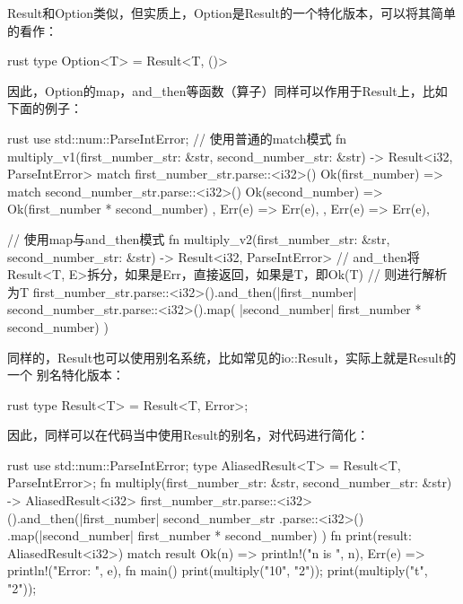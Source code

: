 Result和Option类似，但实质上，Option是Result的一个特化版本，可以将其简单的看作：
\begin{code-block}{rust}
type Option<T> = Result<T, ()>
\end{code-block}

因此，Option的map，and\_then等函数（算子）同样可以作用于Result上，比如下面的例子：
\begin{code-block}{rust}
use std::num::ParseIntError;
// 使用普通的match模式
fn multiply_v1(first_number_str: &str, second_number_str: &str) -> Result<i32, ParseIntError> {
    match first_number_str.parse::<i32>() {
        Ok(first_number)  => {
            match second_number_str.parse::<i32>() {
                Ok(second_number)  => {
                    Ok(first_number * second_number)
                },
                Err(e) => Err(e),
            }
        },
        Err(e) => Err(e),
    }
}

// 使用map与and_then模式
fn multiply_v2(first_number_str: &str,
    second_number_str: &str) -> Result<i32, ParseIntError> {
    // and_then将Result<T, E>拆分，如果是Err，直接返回，如果是T，即Ok(T)
    // 则进行解析为T
    first_number_str.parse::<i32>().and_then(|first_number| {
        second_number_str.parse::<i32>().map(
            |second_number| first_number * second_number)
    })
}
\end{code-block}

同样的，Result也可以使用别名系统，比如常见的io::Result，实际上就是Result的一个
别名特化版本：
\begin{code-block}{rust}
type Result<T> = Result<T, Error>;
\end{code-block}
因此，同样可以在代码当中使用Result的别名，对代码进行简化：
\begin{code-block}{rust}
use std::num::ParseIntError;
type AliasedResult<T> = Result<T, ParseIntError>;
fn multiply(first_number_str: &str,
    second_number_str: &str) -> AliasedResult<i32> {
    first_number_str.parse::<i32>().and_then(|first_number| {
        second_number_str
            .parse::<i32>()
            .map(|second_number| first_number * second_number)
    })
}
fn print(result: AliasedResult<i32>) {
    match result {
        Ok(n) => println!("n is {}", n),
        Err(e) => println!("Error: {}", e),
    }
}
fn main() {
    print(multiply("10", "2"));
    print(multiply("t", "2"));
}
\end{code-block}

